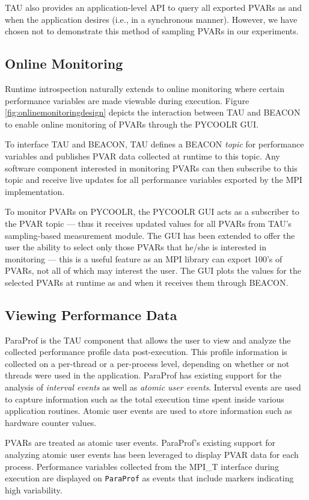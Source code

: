 \par TAU also provides an application-level API to query all exported PVARs as and when the application desires (i.e., in a synchronous manner). However, we have chosen not to demonstrate this method of sampling PVARs in our experiments.

\subsection{Online Monitoring}
Runtime introspection naturally extends to online monitoring where certain performance variables are made viewable during execution. Figure \ref{fig:onlinemonitoringdesign} depicts the interaction between TAU and BEACON to enable online monitoring of PVARs through the PYCOOLR GUI.
\par To interface TAU and BEACON, TAU defines a BEACON \textit{topic} for performance variables and publishes PVAR data collected at runtime to this topic. Any software component interested in monitoring PVARs can then subscribe to this topic and receive live updates for all performance variables exported by the MPI implementation.
\par To monitor PVARs on PYCOOLR, the PYCOOLR GUI acts as a subscriber to the PVAR topic --- thus it receives updated values for all PVARs from TAU's sampling-based measurement module. The GUI has been extended to offer the user the ability to select only those PVARs that he/she is interested in monitoring --- this is a useful feature as an MPI library can export 100's of PVARs, not all of which may interest the user. The GUI plots the values for the selected PVARs at runtime as and when it receives them through BEACON.

\subsection{Viewing Performance Data}
ParaProf is the TAU component that allows the user to view and analyze the collected performance profile data post-execution. This profile information is collected on a per-thread or a per-process level, depending on whether or not threads were used in the application. ParaProf has existing support for the analysis of \textit{interval events} as well as \textit{atomic user events}. Interval events are used to capture information such as the total execution time spent inside various application routines. Atomic user events are used to store information such as hardware counter values. 
\par PVARs are treated as atomic user events. ParaProf's existing support for analyzing atomic user events has been leveraged to display PVAR data for each process. Performance variables collected from the MPI\_T interface during execution are displayed on \verb+ParaProf+ as events that include markers indicating high variability.

